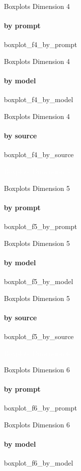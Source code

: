 {\nologo
\begin{frame}{Boxplots Dimension 4}
    \framesubtitle{by prompt}
    {boxplot_f4_by_prompt}
\end{frame}
}

{\nologo
\begin{frame}{Boxplots Dimension 4}
    \framesubtitle{by model}
    {boxplot_f4_by_model}
\end{frame}
}

{\nologo
\begin{frame}{Boxplots Dimension 4}
    \framesubtitle{by source}
    {boxplot_f4_by_source}
\end{frame}
}

{\nologo
{}
\begin{frame}[c,plain]{}
    \vspace*{1cm}
    \centering
    \Huge
    \textcolor{white}{Boxplots Dimension 5}
\end{frame}
}

{\nologo
\begin{frame}{Boxplots Dimension 5}
    \framesubtitle{by prompt}
    {boxplot_f5_by_prompt}
\end{frame}
}

{\nologo
\begin{frame}{Boxplots Dimension 5}
    \framesubtitle{by model}
    {boxplot_f5_by_model}
\end{frame}
}

{\nologo
\begin{frame}{Boxplots Dimension 5}
    \framesubtitle{by source}
    {boxplot_f5_by_source}
\end{frame}
}

{\nologo
{}
\begin{frame}[c,plain]{}
    \vspace*{1cm}
    \centering
    \Huge
    \textcolor{white}{Boxplots Dimension 6}
\end{frame}
}

{\nologo
\begin{frame}{Boxplots Dimension 6}
    \framesubtitle{by prompt}
    {boxplot_f6_by_prompt}
\end{frame}
}

{\nologo
\begin{frame}{Boxplots Dimension 6}
    \framesubtitle{by model}
    {boxplot_f6_by_model}
\end{frame}
}

